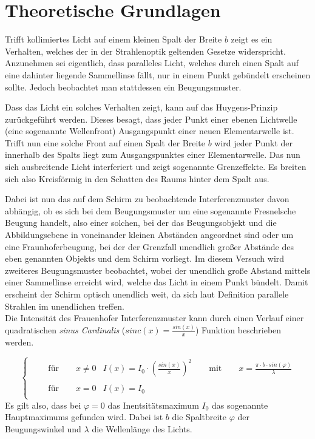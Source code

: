 
\setlength\abovedisplayshortskip{20pt}
\setlength\belowdisplayshortskip{20pt}
\setlength\abovedisplayskip{20pt}
\setlength\belowdisplayskip{20pt}


\section{Theoretische Grundlagen \cite{wedler}}

Trifft kollimiertes Licht auf einem kleinen Spalt der Breite $b$ zeigt es ein Verhalten, welches der in der Strahlenoptik geltenden Gesetze widerspricht. Anzunehmen sei eigentlich, dass paralleles Licht, welches durch einen Spalt auf eine dahinter liegende Sammellinse fällt, nur in einem Punkt gebündelt erscheinen sollte. Jedoch beobachtet man stattdessen ein Beugungsmuster.



Dass das Licht ein solches Verhalten zeigt, kann auf das Huygens-Prinzip zurückgeführt werden. Dieses besagt, dass jeder Punkt einer ebenen Lichtwelle (eine sogenannte Wellenfront) Ausgangspunkt einer neuen Elementarwelle ist. Trifft nun eine solche Front auf einen Spalt der Breite $b$ wird jeder Punkt der innerhalb des Spalts liegt zum Ausgangspunktes einer Elementarwelle. Das nun sich ausbreitende Licht interferiert und zeigt sogenannte Grenzeffekte. Es breiten sich also Kreisförmig in den Schatten des Raums hinter dem Spalt aus. 



Dabei ist nun das auf dem Schirm zu beobachtende Interferenzmuster davon abhängig, ob es sich bei dem Beugungsmuster um eine sogenannte Fresnelsche Beugung handelt, also einer solchen, bei der das Beugungsobjekt und die Abbildungsebene in voneinander kleinen Abständen angeordnet sind oder um eine Fraunhoferbeugung, bei der der Grenzfall unendlich großer Abstände des eben genannten Objekts und dem Schirm vorliegt. 
Im diesem Versuch wird zweiteres Beugungsmuster beobachtet, wobei der unendlich große Abstand mittels einer Sammellinse erreicht wird, welche das Licht in einem Punkt bündelt. Damit erscheint der Schirm optisch unendlich weit, da sich laut Definition parallele Strahlen im unendlichen treffen.
\\

Die  Intensität des Frauenhofer Interferenzmuster kann durch einen Verlauf einer quadratischen \textit{sinus Cardinalis} ($sinc(x)=\frac{sin(x)}{x}$) Funktion beschrieben werden.


\begin{equation}
 \begin{cases}\quad \quad
  \text{für} \quad \quad   x\neq 0 & I(x)=I_0 \cdot\left(\frac{sin(x)}{x}\right)^2 \quad \quad \text{mit} \quad \quad x =\frac{\pi \cdot b\cdot sin(\varphi)}{\lambda}  \\\\ \quad \quad
  \text{für} \quad \quad    x=0 & I(x)=I_0\\    
   \end{cases}
\end{equation}
Es gilt also, dass bei $\varphi=0$ das Inentsitätsmaximum $I_0$ das sogenannte Hauptmaximums gefunden wird. Dabei ist $b$ die Spaltbreite $\varphi$ der Beugungswinkel und $\lambda$ die Wellenlänge des Lichts.


